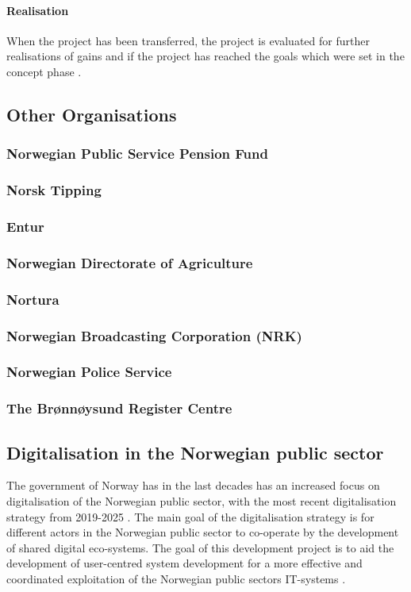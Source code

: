 \paragraph{Realisation}
When the project has been transferred, the project is evaluated for further realisations of gains and if the project has reached the goals which were set in the concept phase \cite{project_wizard_digdir_2023}.

\subsection{Other Organisations}
\subsubsection{Norwegian Public Service Pension Fund}

\subsubsection{Norsk Tipping}

\subsubsection{Entur}

\subsubsection{Norwegian Directorate of Agriculture}

\subsubsection{Nortura}

\subsubsection{Norwegian Broadcasting Corporation (NRK)}

\subsubsection{Norwegian Police Service}

\subsubsection{The Brønnøysund Register Centre}


\subsection{Digitalisation in the Norwegian public sector}
The government of Norway has in the last decades has an increased focus on digitalisation of the Norwegian public sector, with the most recent digitalisation strategy from 2019-2025 \cite{r_2019}. The main goal of the digitalisation strategy is for different actors in the Norwegian public sector to co-operate by the development of shared digital eco-systems. The goal of this development project is to aid the development of user-centred system development for a more effective and coordinated exploitation of the Norwegian public sectors IT-systems \cite{r_2019}.

